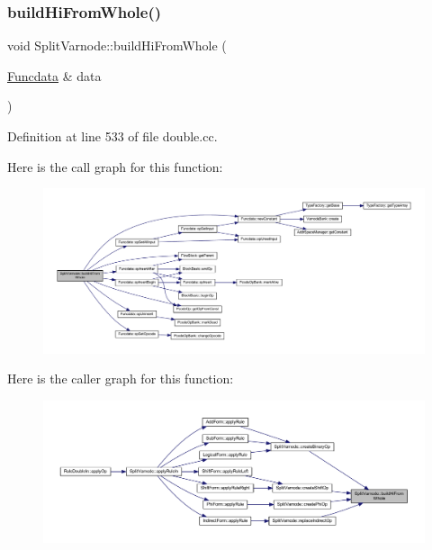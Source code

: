 \subsubsection{\texorpdfstring{buildHiFromWhole()}{buildHiFromWhole()}}
{\footnotesize\ttfamily void Split\+Varnode\+::build\+Hi\+From\+Whole (\begin{DoxyParamCaption}\item[{\mbox{\hyperlink{class_funcdata}{Funcdata}} \&}]{data }\end{DoxyParamCaption})}



Definition at line 533 of file double.\+cc.

Here is the call graph for this function\+:
\nopagebreak
\begin{figure}[H]
\begin{center}
\leavevmode
\includegraphics[width=350pt]{class_split_varnode_a09d3bd3c551ee55ef42da4f01bc44f49_cgraph}
\end{center}
\end{figure}
Here is the caller graph for this function\+:
\nopagebreak
\begin{figure}[H]
\begin{center}
\leavevmode
\includegraphics[width=350pt]{class_split_varnode_a09d3bd3c551ee55ef42da4f01bc44f49_icgraph}
\end{center}
\end{figure}
\mbox{\label{class_split_varnode_ae9cef4fbd2931fb270988180eab642ad}} 
